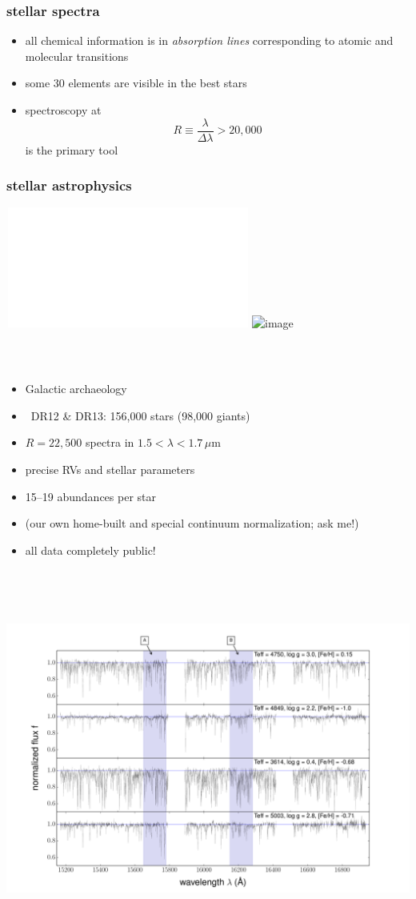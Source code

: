 \documentclass[pdftex]{beamer}
\begin{document}
\begin{frame}
  \frametitle{stellar spectra}
  \begin{itemize}
  \item all chemical information is in \emph{absorption lines} corresponding to atomic and molecular transitions
  \item some 30 elements are visible in the best stars
  \item spectroscopy at $$R\equiv\frac{\lambda}{\Delta\lambda}>20,000$$ is the primary tool
  \end{itemize}
\end{frame}

\begin{frame}
  \frametitle{stellar astrophysics}
  \,\hfill\includegraphics<1>[height=\figureheight]{../documents/paper1/plots/four_examples3.pdf}
         \includegraphics<2>[height=\figureheight]{../documents/paper1/plots/iso2_2.png}
\end{frame}

\begin{frame}
  \frametitle{\sdssiii\ \apogee}
  \begin{itemize}
  \item Galactic archaeology
  \item \apogee\ DR12 \& DR13: 156,000 stars (98,000 giants)
  \item $R=22,500$ spectra in $1.5<\lambda<1.7\,\mu\mathrm{m}$
  \item precise RVs and stellar parameters
  \item 15--19 abundances per star
  \item (our own home-built and special continuum normalization; ask me!)
  \item all data completely public!
  \end{itemize}
\end{frame}

\begin{frame}
  \frametitle{\sdssiii\ \apogee}
  \,\hfill\includegraphics[height=\figureheight]{../documents/paper1/plots/four_examples3.pdf}
\end{frame}
\end{document}
